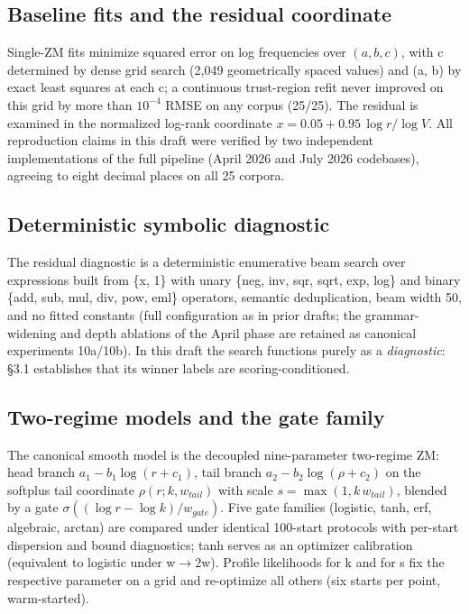 \documentclass[11pt]{article}
\begin{document}
\subsection{Baseline fits and the residual coordinate}
Single-ZM fits minimize squared error on log frequencies over $(a, b, c)$, with c determined by dense grid search (2,049 geometrically spaced values) and (a, b) by exact least squares at each c; a continuous trust-region refit never improved on this grid by more than $10^{-4}$ RMSE on any corpus (25/25). The residual is examined in the normalized log-rank coordinate $x = 0.05 + 0.95\,\log r/\log V$. All reproduction claims in this draft were verified by two independent implementations of the full pipeline (April 2026 and July 2026 codebases), agreeing to eight decimal places on all 25 corpora.

\subsection{Deterministic symbolic diagnostic}
The residual diagnostic is a deterministic enumerative beam search over expressions built from \{x, 1\} with unary \{neg, inv, sqr, sqrt, exp, log\} and binary \{add, sub, mul, div, pow, eml\} operators, semantic deduplication, beam width 50, and no fitted constants (full configuration as in prior drafts; the grammar-widening and depth ablations of the April phase are retained as canonical experiments 10a/10b). In this draft the search functions purely as a \emph{diagnostic}: \S3.1 establishes that its winner labels are scoring-conditioned.

\subsection{Two-regime models and the gate family}
The canonical smooth model is the decoupled nine-parameter two-regime ZM: head branch $a_1 - b_1\log(r+c_1)$, tail branch $a_2 - b_2\log(\rho+c_2)$ on the softplus tail coordinate $\rho(r;k,w_{tail})$ with scale $s=\max(1, k\,w_{tail})$, blended by a gate $\sigma((\log r-\log k)/w_{gate})$. Five gate families (logistic, tanh, erf, algebraic, arctan) are compared under identical 100-start protocols with per-start dispersion and bound diagnostics; tanh serves as an optimizer calibration (equivalent to logistic under w$\to$2w). Profile likelihoods for k and for s fix the respective parameter on a grid and re-optimize all others (six starts per point, warm-started).
\end{document}
